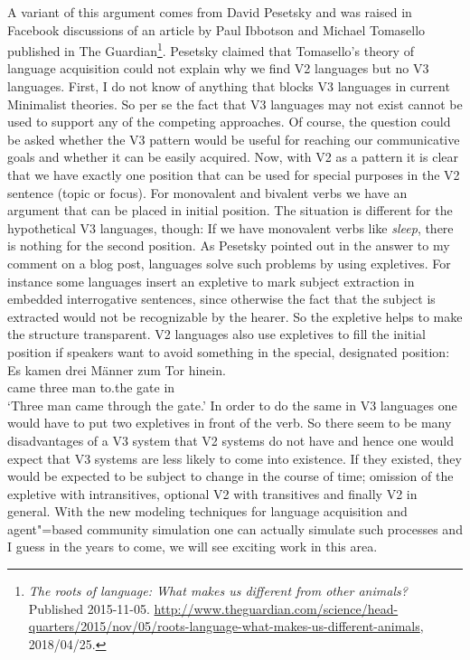A variant of this argument comes from David Pesetsky and was raised in Facebook discussions of an
article by Paul Ibbotson and Michael Tomasello
published in The Guardian\footnote{%
\emph{The roots of language: What makes us different from other animals?} Published
2015-11-05. \url{http://www.theguardian.com/science/head-quarters/2015/nov/05/roots-language-what-makes-us-different-animals}, 2018/04/25.
}. 
Pesetsky claimed that Tomasello's theory of language
acquisition could not explain why we find V2 languages but no V3 languages. First, I do not know of
anything that blocks V3 languages in current Minimalist theories. So per se the fact that V3
languages may not exist cannot be used to support any of the competing approaches. Of course, the
question could be asked whether the V3 pattern would be useful for reaching our communicative goals
and whether it can be easily acquired. Now, with V2 as a pattern it is clear that we have exactly
one position that can be used for special purposes in the V2 sentence (topic or focus). For monovalent and bivalent verbs we
have an argument that can be placed in initial position. The situation is different for the
hypothetical V3 languages, though: If we have monovalent verbs like \emph{sleep}, there is nothing
for the second position. As Pesetsky pointed out in the answer to my comment on a blog post, languages solve such
problems by using expletives. For instance some languages insert an expletive to mark subject
extraction in embedded interrogative sentences, since otherwise the fact that the subject is
extracted would not be recognizable by the hearer. So the expletive helps to make the structure
transparent. V2 languages also use expletives to fill the initial position if speakers want to avoid
something in the special, designated position:
\ea
\gll Es kamen drei Männer zum Tor hinein.\\
     \expl{} came three man to.the gate in\\
\glt `Three man came through the gate.'
\z
In order to do the same in V3 languages one would have to put two expletives in front of the
verb. So there seem to be many disadvantages of a V3 system that V2 systems do not have and hence
one would expect that V3 systems are less likely to come into existence. If they existed, they would
be expected to be subject to change in the course of time; \eg omission of the expletive with
intransitives, optional V2 with transitives and finally V2 in general. With the new modeling
techniques for language acquisition and agent"=based community simulation one can actually simulate
such processes and I guess in the years to come, we will see exciting work in this area. 

